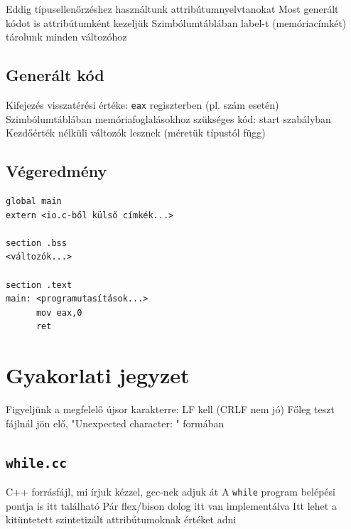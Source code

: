 \documentclass[12pt,a4paper]{article}
\begin{document}
\begin{outline}
	\1 Eddig típusellenőrzéshez használtunk attribútumnyelvtanokat
	\1 Most generált kódot is attribútumként kezeljük
	\1 Szimbólumtáblában label-t (memóriacímkét) tárolunk minden változóhoz
\end{outline}

\subsection{Generált kód}

\begin{outline}
	\1 Kifejezés visszatérési értéke: \texttt{eax} regiszterben (pl. szám esetén)
	\1 Szimbólumtáblában memóriafoglalásokhoz szükséges kód: start szabályban
		\2 Kezdőérték nélküli változók lesznek (méretük típustól függ)
\end{outline}

\subsection{Végeredmény}

\begin{verbatim}
global main
extern <io.c-ből külső címkék...>

section .bss
<változók...>

section .text
main: <programutasítások...>
      mov eax,0
      ret\end{verbatim}

\pagebreak

\section{Gyakorlati jegyzet}

\begin{outline}
	\1 Figyeljünk a megfelelő újsor karakterre: LF kell (CRLF nem jó)
		\2 Főleg teszt fájlnál jön elő, "Unexpected character: " formában
\end{outline}

\subsection{\texttt{while.cc}}

\begin{outline}
	\1 C++ forrásfájl, mi írjuk kézzel, gcc-nek adjuk át
	\1 A \texttt{while} program belépési pontja is itt található
	\1 Pár flex/bison dolog itt van implementálva
	\1 Itt lehet a kitüntetett szintetizált attribútumoknak értéket adni
\end{outline}
\end{document}
